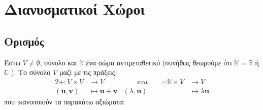 


\let\vec\mathbf

\pagestyle{vangelis}




\chapter{Διανυσματικοί Χώροι}


\section{Ορισμός}

\begin{dfn}
\item {}
    Έστω $V \neq \emptyset $, σύνολο και $\mathbb{K}$ ένα σώμα αντιμεταθετικό 
    (συνήθως θεωρούμε ότι $ \mathbb{K} = \mathbb{R} $ ή $\mathbb{C}$ ). 
    Το σύνολο $V$ μαζί με τις πράξεις:
    \begin{alignat*}{2}
        + \colon V \times V &\to V & \qquad \text{και} \qquad \cdot \colon \mathbb{K} 
        \times V &\to V \\ ( \vec{u}, \vec{v} ) &\mapsto \vec{u} + \vec{v} 
                 & ( \lambda, \vec{u} ) &\mapsto \lambda \vec{u} 
    \end{alignat*}
    \vspace{\baselineskip}
    που ικανοποιούν τα παρακάτω αξιώματα:


\end{dfn}
